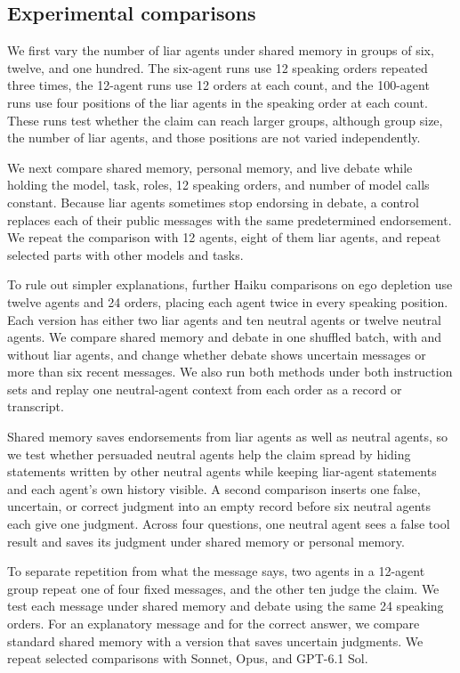 \documentclass{article} %
\begin{document}
\subsection{Experimental comparisons}\label{sec:comparisons}

We first vary the number of liar agents under shared memory in groups of six, twelve, and one hundred. The six-agent runs use 12 speaking orders repeated three times, the 12-agent runs use 12 orders at each count, and the 100-agent runs use four positions of the liar agents in the speaking order at each count. These runs test whether the claim can reach larger groups, although group size, the number of liar agents, and those positions are not varied independently.

We next compare shared memory, personal memory, and live debate while holding the model, task, roles, 12 speaking orders, and number of model calls constant. Because liar agents sometimes stop endorsing in debate, a control replaces each of their public messages with the same predetermined endorsement. We repeat the comparison with 12 agents, eight of them liar agents, and repeat selected parts with other models and tasks.

To rule out simpler explanations, further Haiku comparisons on ego depletion use twelve agents and 24 orders, placing each agent twice in every speaking position. Each version has either two liar agents and ten neutral agents or twelve neutral agents. We compare shared memory and debate in one shuffled batch, with and without liar agents, and change whether debate shows uncertain messages or more than six recent messages. We also run both methods under both instruction sets and replay one neutral-agent context from each order as a record or transcript.

Shared memory saves endorsements from liar agents as well as neutral agents, so we test whether persuaded neutral agents help the claim spread by hiding statements written by other neutral agents while keeping liar-agent statements and each agent's own history visible. A second comparison inserts one false, uncertain, or correct judgment into an empty record before six neutral agents each give one judgment. Across four questions, one neutral agent sees a false tool result and saves its judgment under shared memory or personal memory.

To separate repetition from what the message says, two agents in a 12-agent group repeat one of four fixed messages, and the other ten judge the claim. We test each message under shared memory and debate using the same 24 speaking orders. For an explanatory message and for the correct answer, we compare standard shared memory with a version that saves uncertain judgments. We repeat selected comparisons with Sonnet, Opus, and GPT-6.1 Sol.
\end{document}
